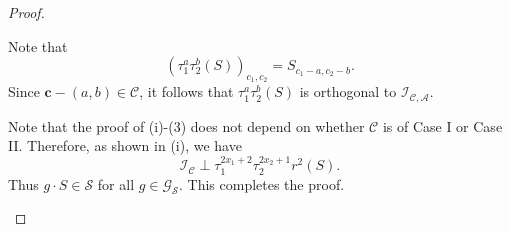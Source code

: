 \documentclass[10pt,a4paper]{amsart}
\begin{document}
\begin{proof}
\begin{enumerate}
Note that
\[
(\tau_1^{a}\tau_2^{b}(S))_{c_1, c_2}=S_{c_1-a, c_2-b}.
\]
Since $\mathbf{c}-(a, b)\in\mathcal{C}$, it follows that $\tau_1^{a}\tau_2^{b}(S)$ is orthogonal to $\mathcal{I}_{\mathcal{C}, \mathcal{A}}$.

Note that the proof of (i)-(3) does not depend on whether $\mathcal{C}$ is of Case I or Case II. Therefore, as shown in (i), we have
\[
\mathcal{I}_\mathcal{C}\perp\tau_1^{2x_1+2} \tau_2^{2x_2+1} r^2(S).
\]
Thus $g\cdot S\in\mathcal{S}$ for all $g\in \mathcal{G}_\mathcal{S}$. This completes the proof.
\end{enumerate}
\end{proof}
\end{document}

